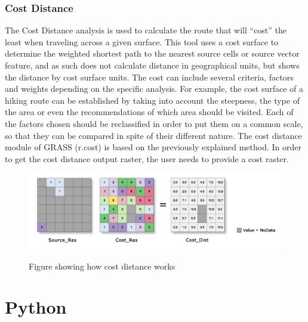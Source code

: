 \subsubsection{Cost Distance}
The Cost Distance analysis is used to calculate the route that will “cost” the least when traveling across a given surface. This tool uses a cost surface to determine the weighted shortest path to the nearest source cells or source vector feature, and as such does not calculate distance in geographical units, but shows the distance by cost surface units. The cost can include several criteria, factors and weights depending on the specific analysis. For example, the cost surface of a hiking route can be established by taking into account the steepness, the type of the area or even the recommendations of which area should be visited.
Each of the factors chosen should be reclassified in order to put them on a common scale, so that they can be compared in spite of their different nature. 
The cost distance module of GRASS (r.cost) is based on the previously explained method. In order to get the cost distance output raster, the user needs to provide a cost raster.

\begin{figure}[t]
\centering
	{\includegraphics[width=\linewidth]{gfx/COST.png}}
\caption{Figure showing how cost distance works}
\end{figure}


\section{Python}\label{sec:issues}

